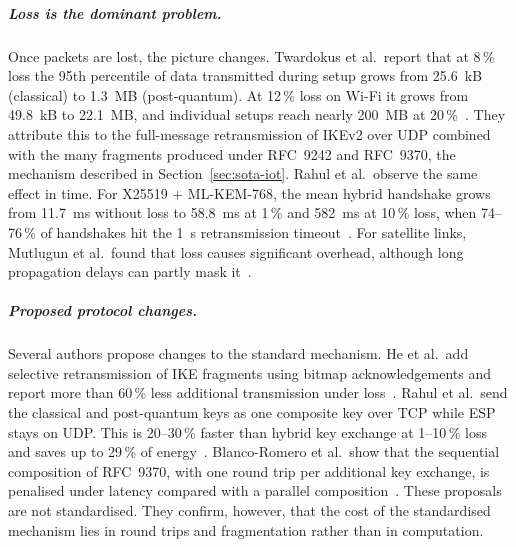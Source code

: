 \subparagraph{Loss is the dominant problem.}
Once packets are lost, the picture changes. Twardokus et al.\ report that at
8\,\% loss the 95th percentile of data transmitted during setup grows from
25.6~kB (classical) to 1.3~MB (post-quantum). At 12\,\% loss on Wi-Fi it grows
from 49.8~kB to 22.1~MB, and individual setups reach nearly 200~MB at
20\,\%~\cite{twardokus2025}. They attribute this to the full-message
retransmission of IKEv2 over UDP combined with the many fragments produced
under RFC~9242 and RFC~9370, the mechanism described in
Section~\ref{sec:sota-iot}. Rahul et al.\ observe the same effect in time.
For X25519 + ML-KEM-768, the mean hybrid handshake grows from 11.7~ms without
loss to 58.8~ms at 1\,\% and 582~ms at 10\,\% loss, when 74--76\,\% of
handshakes hit the 1~s retransmission timeout~\cite{rahul2026}. For satellite
links, Mutlugun et al.\ found that loss causes significant overhead, although
long propagation delays can partly mask it~\cite{mutlugun2024}.

\subparagraph{Proposed protocol changes.}
Several authors propose changes to the standard mechanism. He et al.\ add
selective retransmission of IKE fragments using bitmap acknowledgements and
report more than 60\,\% less additional transmission under
loss~\cite{he2025}. Rahul et al.\ send the classical and post-quantum keys as
one composite key over TCP while ESP stays on UDP. This is 20--30\,\% faster
than hybrid key exchange at 1--10\,\% loss and saves up to 29\,\% of
energy~\cite{rahul2026}. Blanco-Romero et al.\ show that the sequential
composition of RFC~9370, with one round trip per additional key exchange,
is penalised under latency compared with a parallel
composition~\cite{blancoromero2025}. These proposals are not standardised.
They confirm, however, that the cost of the standardised mechanism lies in
round trips and fragmentation rather than in computation.

